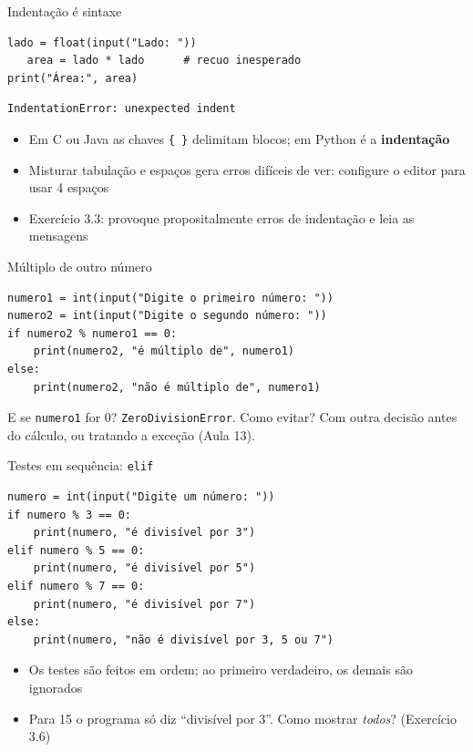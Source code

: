 \documentclass[aspectratio=169,10pt,t]{beamer}
\begin{document}
\begin{frame}[fragile]{Indentação é sintaxe}
\begin{lstlisting}
lado = float(input("Lado: "))
   area = lado * lado      # recuo inesperado
print("Área:", area)
\end{lstlisting}
\begin{lstlisting}[style=saida]
IndentationError: unexpected indent
\end{lstlisting}
  \begin{itemize}
    \item Em C ou Java as chaves \texttt{\{ \}} delimitam blocos; em Python é a \textbf{indentação}
    \item Misturar tabulação e espaços gera erros difíceis de ver: configure o editor para usar 4 espaços
    \item Exercício 3.3: provoque propositalmente erros de indentação e leia as mensagens
  \end{itemize}
\end{frame}

\begin{frame}[fragile]{Múltiplo de outro número}
\begin{lstlisting}
numero1 = int(input("Digite o primeiro número: "))
numero2 = int(input("Digite o segundo número: "))
if numero2 % numero1 == 0:
    print(numero2, "é múltiplo de", numero1)
else:
    print(numero2, "não é múltiplo de", numero1)
\end{lstlisting}
  \begin{alertblock}{E se \texttt{numero1} for 0?}
    \texttt{ZeroDivisionError}. Como evitar? Com outra decisão antes do cálculo, ou tratando a exceção (Aula 13).
  \end{alertblock}
\end{frame}

\begin{frame}[fragile]{Testes em sequência: \texttt{elif}}
\begin{lstlisting}
numero = int(input("Digite um número: "))
if numero % 3 == 0:
    print(numero, "é divisível por 3")
elif numero % 5 == 0:
    print(numero, "é divisível por 5")
elif numero % 7 == 0:
    print(numero, "é divisível por 7")
else:
    print(numero, "não é divisível por 3, 5 ou 7")
\end{lstlisting}
  \begin{itemize}
    \item Os testes são feitos \alert{em ordem}; ao primeiro verdadeiro, os demais são ignorados
    \item Para 15 o programa só diz ``divisível por 3''. Como mostrar \emph{todos}? (Exercício 3.6)
  \end{itemize}
\end{frame}
\end{document}
